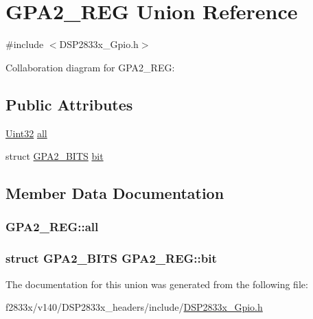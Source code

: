 \hypertarget{union_g_p_a2___r_e_g}{}\section{G\+P\+A2\+\_\+\+R\+E\+G Union Reference}
\label{union_g_p_a2___r_e_g}


{\ttfamily \#include $<$D\+S\+P2833x\+\_\+\+Gpio.\+h$>$}



Collaboration diagram for G\+P\+A2\+\_\+\+R\+E\+G\+:
\subsection*{Public Attributes}
\begin{DoxyCompactItemize}
\item 
\hyperlink{_d_s_p2833x___device_8h_aba99025e657f892beb7ff31cecf64653}{Uint32} \hyperlink{union_g_p_a2___r_e_g_acd8ad13a097fc14c03caf18d89352c31}{all}
\item 
struct \hyperlink{struct_g_p_a2___b_i_t_s}{G\+P\+A2\+\_\+\+B\+I\+T\+S} \hyperlink{union_g_p_a2___r_e_g_a55447d19f51fb230c7a7b5e57b624f5e}{bit}
\end{DoxyCompactItemize}


\subsection{Member Data Documentation}
\hypertarget{union_g_p_a2___r_e_g_acd8ad13a097fc14c03caf18d89352c31}{}
\subsubsection[{all}]{ G\+P\+A2\+\_\+\+R\+E\+G\+::all}\label{union_g_p_a2___r_e_g_acd8ad13a097fc14c03caf18d89352c31}
\hypertarget{union_g_p_a2___r_e_g_a55447d19f51fb230c7a7b5e57b624f5e}{}
\subsubsection[{bit}]{\setlength{\rightskip}{0pt plus 5cm}struct {\bf G\+P\+A2\+\_\+\+B\+I\+T\+S} G\+P\+A2\+\_\+\+R\+E\+G\+::bit}\label{union_g_p_a2___r_e_g_a55447d19f51fb230c7a7b5e57b624f5e}


The documentation for this union was generated from the following file\+:\begin{DoxyCompactItemize}
\item 
f2833x/v140/\+D\+S\+P2833x\+\_\+headers/include/\hyperlink{_d_s_p2833x___gpio_8h}{D\+S\+P2833x\+\_\+\+Gpio.\+h}\end{DoxyCompactItemize}
